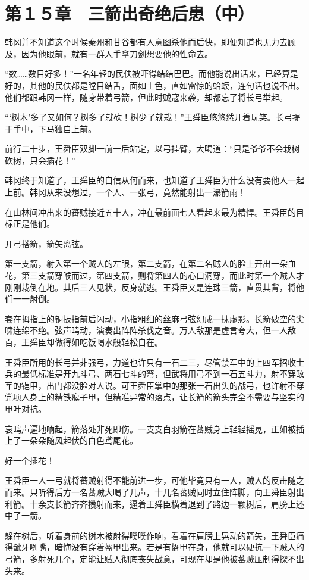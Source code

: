 \section{第１５章　三箭出奇绝后患（中）}

韩冈并不知道这个时候秦州和甘谷都有人意图杀他而后快，即便知道也无力去顾及，因为他眼前，就有一群人手拿刀剑想要他的性命去。

“数……数目好多！”一名年轻的民伕被吓得结结巴巴。而他能说出话来，已经算是好的，其他的民伕都是瞠目结舌，面如土色，直如雷惊的蛤蟆，连句话也说不出。他们都跟韩冈一样，随身带着弓箭，但此时贼寇来袭，却都忘了将长弓举起。

“‘树木’多了又如何？树多了就砍！树少了就栽！”王舜臣悠悠然开着玩笑。长弓提于手中，下马独自上前。

前行二十步，王舜臣双脚一前一后站定，以弓挂臂，大喝道：“只是爷爷不会栽树砍树，只会插花！”

韩冈终于知道了，王舜臣的自信从何而来，也知道了王舜臣为什么没有要他人一起上前。韩冈从来没想过，一个人、一张弓，竟然能射出一瀑箭雨！

在山林间冲出来的蕃贼接近五十人，冲在最前面七人看起来最为精悍。王舜臣的目标正是他们。

开弓搭箭，箭矢离弦。

第一支箭，射入第一个贼人的左眼，第二支箭，在第二名贼人的脸上开出一朵血花，第三支箭穿喉而过，第四支箭，则将第四人的心口洞穿，而此时第一个贼人才刚刚栽倒在地。其后三人见状，反身就逃。王舜臣又是连珠三箭，直贯其背，将他们一一射倒。

套在拇指上的铜扳指前后闪动，小指粗细的丝麻弓弦幻成一抹虚影。长箭破空的尖啸连绵不绝。弦声鸣动，演奏出阵阵杀伐之音。万人敌那是虚言夸大，但一人敌百，王舜臣却做得如吃饭喝水般轻松自在。

王舜臣所用的长弓并非强弓，力道也许只有一石二三，尽管禁军中的上四军招收士兵的最低标准是开九斗弓、两石七斗的弩，但武将用弓不到一石五斗力，射不穿敌军的铠甲，出门都没脸对人说。可王舜臣掌中的那张一石出头的战弓，也许射不穿党项人身上的精铁瘊子甲，但精准异常的落点，让长箭的箭头完全不需要与坚实的甲叶对抗。

哀鸣声遍地响起，箭落处非死即伤。一支支白羽箭在蕃贼身上轻轻摇晃，正如被插上了一朵朵随风起伏的白色鸢尾花。

好一个插花！

王舜臣一人一弓就将蕃贼射得不能前进一步，可他毕竟只有一人，贼人的反击随之而来。只听得后方一名蕃贼大喝了几声，十几名蕃贼同时立住阵脚，向王舜臣射出利箭。十余支长箭齐齐攒射而来，逼着王舜臣横着退到了路边一颗树后，肩膀上还中了一箭。

躲在树后，听着身前的树木被射得噗噗作响，看着在肩膀上晃动的箭矢，王舜臣痛得龇牙咧嘴，暗悔没有穿着盔甲出来。若是有盔甲在身，他就可以硬抗一下贼人的弓箭，多射死几个，定能让贼人彻底丧失战意，可现在却是他被蕃贼压制得探不出头来。

